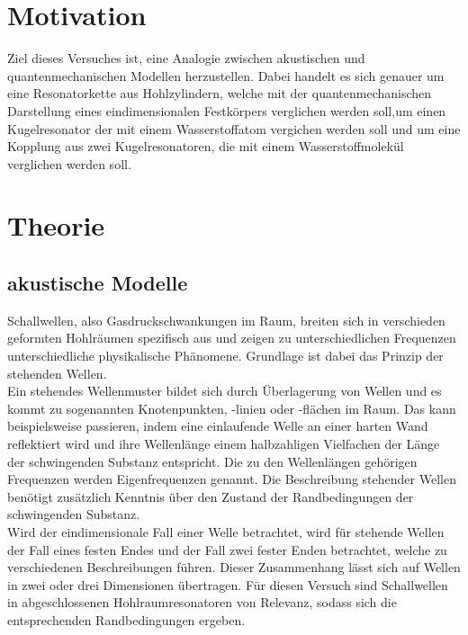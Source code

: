 \section{Motivation}
\label{sec:Motivation}
Ziel dieses Versuches ist, eine Analogie zwischen akustischen und quantenmechanischen 
Modellen herzustellen. Dabei handelt es sich genauer um eine Resonatorkette aus 
Hohlzylindern, 
welche mit der quantenmechanischen Darstellung eines eindimensionalen Festkörpers 
verglichen werden soll,um einen Kugelresonator der mit einem Wasserstoffatom 
vergichen werden soll und um eine 
Kopplung aus zwei Kugelresonatoren, die mit einem Wasserstoffmolekül verglichen werden 
soll.

\section{Theorie}
\label{sec:Theorie}

\subsection{akustische Modelle}
Schallwellen, also Gasdruckschwankungen im Raum, breiten sich in verschieden geformten 
Hohlräumen spezifisch aus und zeigen zu unterschiedlichen Frequenzen unterschiedliche 
physikalische Phänomene. Grundlage ist dabei das Prinzip der stehenden Wellen.\\

Ein stehendes Wellenmuster bildet sich durch Überlagerung von Wellen und es kommt zu 
sogenannten Knotenpunkten, -linien oder -flächen im Raum. Das kann beispielsweise 
passieren, indem eine einlaufende Welle an einer harten Wand reflektiert wird und ihre 
Wellenlänge einem halbzahligen Vielfachen der Länge der schwingenden Substanz entspricht.
Die zu den Wellenlängen gehörigen Frequenzen werden Eigenfrequenzen genannt.
Die Beschreibung stehender Wellen benötigt zusätzlich Kenntnis über den Zustand der 
Randbedingungen der schwingenden Substanz.\\

Wird der eindimensionale Fall einer Welle betrachtet, wird für stehende Wellen der Fall 
eines festen Endes und der Fall zwei fester Enden betrachtet, welche zu verschiedenen 
Beschreibungen führen. Dieser Zusammenhang lässt 
sich auf Wellen in zwei oder drei Dimensionen übertragen. Für diesen Versuch sind 
Schallwellen in abgeschlossenen Hohlraumresonatoren von Relevanz, sodass
sich die entsprechenden Randbedingungen ergeben.\\

